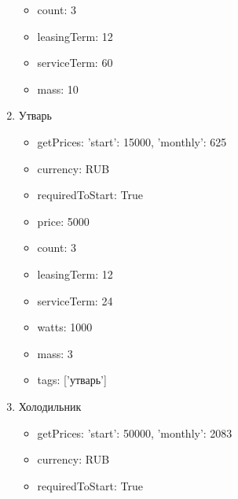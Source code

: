 \documentclass[a4paper,12pt]{article}
\begin{document}
\begin{enumerate}
\begin{itemize}
          \item count: 3
        
          \item leasingTerm: 12
        
          \item serviceTerm: 60
        
          \item mass: 10
        
        \end{itemize}
      
      \item Утварь
        \begin{itemize}
        
          \item getPrices: {'start': 15000, 'monthly': 625}
        
          \item currency: RUB
        
          \item requiredToStart: True
        
          \item price: 5000
        
          \item count: 3
        
          \item leasingTerm: 12
        
          \item serviceTerm: 24
        
          \item watts: 1000
        
          \item mass: 3
        
          \item tags: ['утварь']
        
        \end{itemize}
      
      \item Холодильник
        \begin{itemize}
        
          \item getPrices: {'start': 50000, 'monthly': 2083}
        
          \item currency: RUB
        
          \item requiredToStart: True
        

\end{itemize}
\end{enumerate}
\end{document}
